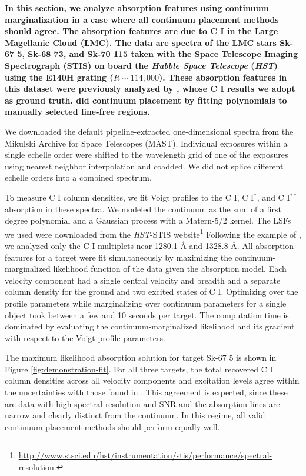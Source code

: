 \documentclass[manuscript]{aastex62}
\begin{document}
{ \bf
In this section, we analyze absorption features using continuum marginalization in a case where all continuum placement methods should agree.
The absorption features are due to {C \small{I}} in the Large Magellanic Cloud (LMC).
The data are spectra of the LMC stars Sk-67 5, Sk-68 73, and Sk-70 115 taken with the Space Telescope Imaging Spectrograph (STIS) \citep{1998PASP..110.1183W} on board the \emph{Hubble Space Telescope} (\emph{HST}) using the E140H grating ($R \sim 114,000$).
These absorption features in this dataset were previously analyzed by \citet{Welty:2016}, whose {C \small I} results we adopt as ground truth.
\citet{Welty:2016} did continuum placement by fitting polynomials to manually selected line-free regions.

We downloaded the default pipeline-extracted one-dimensional spectra from the Mikulski Archive for Space Telescopes (MAST).
Individual exposures within a single echelle order were shifted to the wavelength grid of one of the exposures using nearest neighbor interpolation and coadded.
We did not splice different echelle orders into a combined spectrum.

To measure {C \small{I}} column densities, we fit Voigt profiles to the {C \small{I}}, {C \small{I}$^*$}, and {C \small{I}$^{**}$} absorption in these spectra.
We modeled the continuum as the sum of a first degree polynomial and a Gaussian process with a Matern-5/2 kernel.
The LSFs we used were downloaded from the \emph{HST}-STIS website\footnote{\url{http://www.stsci.edu/hst/instrumentation/stis/performance/spectral-resolution}.}
Following the example of \citet{Welty:2016}, we analyzed only the {C \small{I}} multiplets near 1280.1 \AA{} and 1328.8 \AA.
All absorption features for a target were fit simultaneously by maximizing the continuum-marginalized likelihood function of the data given the absorption model.
Each velocity component had a single central velocity and breadth and a separate column density for the ground and two excited states of {C \small{I}}.
Optimizing over the profile parameters while marginalizing over continuum parameters for a single object took between a few and 10 seconds per target.
The computation time is dominated by evaluating the continuum-marginalized likelihood and its gradient with respect to the Voigt profile parameters.

The maximum likelihood absorption solution for target Sk-67 5 is shown in Figure \ref{fig:demonstration-fit}.
For all three targets, the total recovered {C \small{I}} column densities across all velocity components and excitation levels agree within the uncertainties with those found in \citet{Welty:2016}.
This agreement is expected, since these are data with high spectral resolution and SNR and the absorption lines are narrow and clearly distinct from the continuum.
In this regime, all valid continuum placement methods should perform equally well.

}
\end{document}
